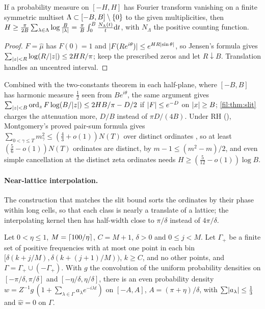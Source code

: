\begin{lemma}\label{rec:lem:jensensupport}
If a probability measure on $[-H,H]$ has Fourier transform vanishing on a finite symmetric multiset
$\Lambda\subset[-B,B]\setminus\{0\}$ to the given multiplicities, then
$H\ge\frac\pi{2B}\sum_{\lambda\in\Lambda}\log\frac B{\lvert\lambda\rvert}=\frac\pi B\int_0^B\frac{N_\Lambda(t)}t\mathrm{d} t$, with $N_\Lambda$ the positive counting
function.
\end{lemma}

\begin{proof}
$F=\widehat\mu$ has $F(0)=1$ and $\lvert F(Re^{i\theta})\rvert\le e^{HR\lvert\sin\theta\rvert}$, so Jensen's formula gives
$\sum_{\lvert z\rvert<R}\log(R/\lvert z\rvert)\le2HR/\pi$; keep the prescribed zeros and let $R\downarrow B$. Translation handles an
uncentred interval.
\end{proof}

Combined with the two-constants theorem in each half-plane, where $[-B,B]$ has harmonic measure $\tfrac12$
seen from $Be^{i\theta}$, the same argument gives $\sum_{\lvert z\rvert<B}\operatorname{ord}_zF\log(B/\lvert z\rvert)\le2HB/\pi-D/2$ if
$\lvert F\rvert\le e^{-D}$ on $\lvert x\rvert\ge B$; \cref{fil:thm:slit} charges the attenuation more, $D/B$ instead of
$\pi D/(4B)$. Under RH (\stG), Montgomery's proved pair-sum formula gives
$\sum_{0<\gamma\le T}m_\gamma^2\le(\tfrac43+o(1))N(T)$ over distinct ordinates
\cite{Montgomery1973Pair,ConreyGhoshGonek1998Simple}, so at least $(\tfrac56-o(1))N(T)$ ordinates are distinct, by
$m-1\le(m^2-m)/2$, and even simple cancellation at the distinct zeta ordinates needs
$H\ge(\tfrac5{12}-o(1))\log B$.

\paragraph{Near-lattice interpolation.}
The construction that matches the slit bound sorts the ordinates by their phase within long cells, so that
each class is nearly a translate of a lattice; the interpolating kernel then has half-width close to
$\pi/\delta$ instead of $4\pi/\delta$.

\begin{lemma}\label{fil:lem:phase}
Let $0<\eta\le1$, $M=\lceil100/\eta\rceil$, $C=M+1$, $\delta>0$ and $0\le j<M$. Let $\Gamma_+$ be a finite set of
positive frequencies with at most one point in each bin $[\delta(k+j/M),\delta(k+(j+1)/M))$, $k\ge C$, and no
other points, and $\Gamma=\Gamma_+\cup(-\Gamma_+)$. With $g$ the convolution of the uniform probability densities
on $[-\pi/\delta,\pi/\delta]$ and $[-\eta/\delta,\eta/\delta]$, there is an even probability density
$w=Z^{-1}g\,(1+\sum_{\lambda\in\Gamma}a_\lambda e^{-i\lambda t})$ on $[-A,A]$, $A=(\pi+\eta)/\delta$, with
$\sum\lvert a_\lambda\rvert\le\tfrac13$ and $\widehat w=0$ on $\Gamma$.
\end{lemma}

